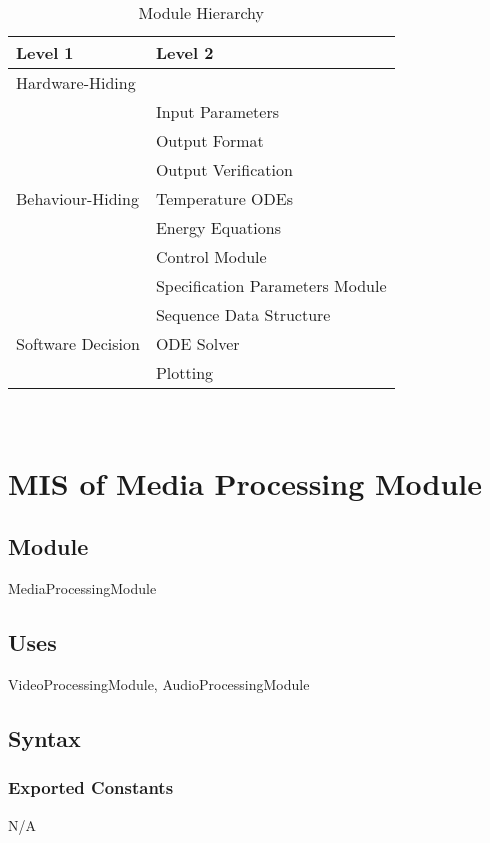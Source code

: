 \documentclass[12pt, titlepage]{article}
\begin{document}
\begin{table}[h!]
\centering
\begin{tabular}{p{} p{}}
\toprule
\textbf{Level 1} & \textbf{Level 2}\\
\midrule

{Hardware-Hiding} & ~ \\
\midrule

\multirow{7}{0.3\textwidth}{Behaviour-Hiding} & Input Parameters\\
& Output Format\\
& Output Verification\\
& Temperature ODEs\\
& Energy Equations\\ 
& Control Module\\
& Specification Parameters Module\\
\midrule

\multirow{3}{0.3\textwidth}{Software Decision} & {Sequence Data Structure}\\
& ODE Solver\\
& Plotting\\
\bottomrule

\end{tabular}
\caption{Module Hierarchy}
\label{TblMH}
\end{table}

\newpage
~\newpage

\section{MIS of Media Processing Module} \label{MediaProcessingModule}

\subsection{Module}
MediaProcessingModule

\subsection{Uses}
VideoProcessingModule, AudioProcessingModule

\subsection{Syntax}

\subsubsection{Exported Constants}
N/A
\end{document}
